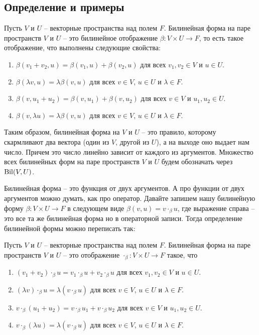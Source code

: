 \subsection{Определение и примеры}

\begin{definition}
\label{def::BilinearForms}
Пусть $V$ и $U$ -- векторные пространства над полем $F$.
Билинейная форма на паре пространств $V$ и $U$ -- это билинейное отображение $\beta\colon V\times U \to F$, то есть такое отображение, что выполнены следующие свойства:
\begin{enumerate}
\item $\beta(v_1 + v_2, u) = \beta(v_1,u) + \beta(v_2,u)$ для всех $v_1,v_2\in V$ и $u\in U$.

\item $\beta(\lambda v, u) = \lambda \beta(v,u)$ для всех $v\in V$, $u\in U$ и $\lambda\in F$.

\item $\beta(v, u_1+u_2) = \beta(v, u_1) + \beta(v,u_2)$ для всех $v\in V$ и $u_1,u_2\in U$.

\item $\beta(v,\lambda u) = \lambda\beta(v,u)$ для всех $v\in V$, $u\in U$ и $\lambda\in F$.
\end{enumerate}
\end{definition}

Таким образом, билинейная форма на $V$ и $U$ -- это правило, которому скармливают два вектора (один из $V$, другой из $U$), а на выходе оно выдает нам число.
Причем это число линейно зависит от каждого из аргументов.
Множество всех билинейных форм на паре пространств $V$ и $U$ будем обозначать через $\operatorname{Bil}(V,U)$.

Билинейная форма -- это функция от двух аргументов.
А про функции от двух аргументов можно думать, как про оператор.
Давайте запишем нашу билинейную форму $\beta\colon V\times U \to F$ в следующем виде $\beta(v,u) = v \cdot_\beta u$, где выражение справа -- это все та же билинейная форма но в операторной записи.
Тогда определение билинейной формы можно переписать так:
\begin{definition}
Пусть $V$ и $U$ -- векторные пространства над полем $F$.
Билинейная форма на паре пространств $V$ и $U$ -- это отображение $\cdot_\beta\colon V\times U \to F$ такое, что
\begin{enumerate}
\item $(v_1 + v_2)\cdot_\beta u = v_1\cdot_\beta u + v_2\cdot_\beta u$ для всех $v_1,v_2\in V$ и $u\in U$.

\item $(\lambda v)\cdot_\beta u = \lambda (v\cdot_\beta u)$ для всех $v\in V$, $u\in U$ и $\lambda\in F$.

\item $v\cdot_\beta( u_1+u_2) = v\cdot_\beta u_1 + v\cdot_\beta u_2$ для всех $v\in V$ и $u_1,u_2\in U$.

\item $v\cdot_\beta(\lambda u) = \lambda (v\cdot_\beta u)$ для всех $v\in V$, $u\in U$ и $\lambda\in F$.
\end{enumerate}
\end{definition}

